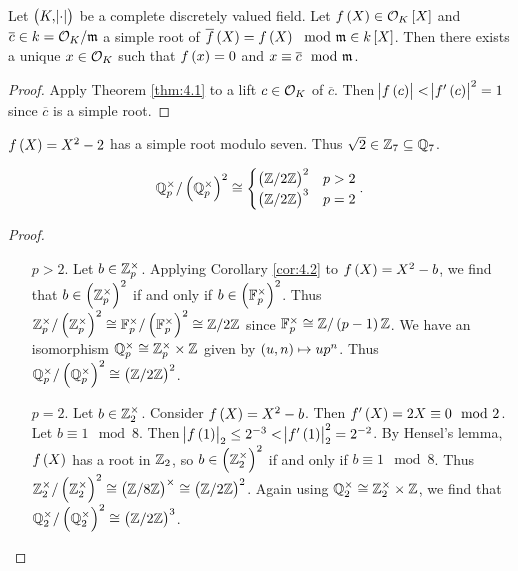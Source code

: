 \begin{corollary}
\label{cor:4.2}
Let $ \br{K, \abs{\cdot}} $ be a complete discretely valued field. Let $ f\br{X} \in \OOO_K\sbr{X} $ and $ \overline{c} \in k = \mathcal{O}_K / \mathfrak{m} $ a simple root of $ \overline{f}\br{X} = f\br{X} \mod \mmm \in k\sbr{X} $. Then there exists a unique $ x \in \mathcal{O}_K $ such that $ f\br{x} = 0 $ and $ x \equiv \overline{c} \mod {\mathfrak{m}} $.
\end{corollary}

\begin{proof}
Apply Theorem \ref{thm:4.1} to a lift $ c \in \mathcal{O}_K $ of $ \overline{c} $. Then $ \abs{f\br{c}} < \abs{f'\br{c}}^2 = 1 $ since $ \overline{c} $ is a simple root.
\end{proof}

\begin{example*}
$ f\br{X} = X^2 - 2 $ has a simple root modulo seven. Thus $ \sqrt{2} \in \mathbb{Z}_7 \subseteq \mathbb{Q}_7 $.
\end{example*}

\pagebreak

\begin{corollary}
$$ \QQ_p^\times / \br{\QQ_p^\times}^2 \cong
\begin{cases}
\br{\ZZ / 2\ZZ}^2 & p > 2 \\
\br{\ZZ / 2\ZZ}^3 & p = 2
\end{cases}.
$$
\end{corollary}

\begin{proof}
\hfill
\begin{itemize}[leftmargin=0.5in]
\item[$ p > 2 $.] Let $ b \in \mathbb{Z}_p^\times $. Applying Corollary \ref{cor:4.2} to $ f\br{X} = X^2 - b $, we find that $ b \in \br{\ZZ_p^\times}^2 $ if and only if $ b \in \br{\FF_p^\times}^2 $. Thus $ \ZZ_p^\times / \br{\ZZ_p^\times}^2 \cong \FF_p^\times / \br{\FF_p^\times}^2 \cong \ZZ / 2\ZZ $ since $ \FF_p^\times \cong \ZZ / \br{p - 1}\ZZ $. We have an isomorphism $ \mathbb{Q}_p^\times \cong \mathbb{Z}_p^\times \times \mathbb{Z} $ given by $ \br{u, n} \mapsto up^n $. Thus $ \QQ_p^\times / \br{\QQ_p^\times}^2 \cong \br{\ZZ / 2\ZZ}^2 $.
\item[$ p = 2 $.] Let $ b \in \mathbb{Z}_2^\times $. Consider $ f\br{X} = X^2 - b $. Then $ f'\br{X} = 2X \equiv 0 \mod 2 $. Let $ b \equiv 1 \mod 8 $. Then $ \abs{f\br{1}}_2 \le 2^{-3} < \abs{f'\br{1}}_2^2 = 2^{-2} $. By Hensel's lemma, $ f\br{X} $ has a root in $ \mathbb{Z}_2 $, so $ b \in \br{\ZZ_2^\times}^2 $ if and only if $ b \equiv 1 \mod 8 $. Thus $ \ZZ_2^\times / \br{\ZZ_2^\times}^2 \cong \br{\ZZ / 8\ZZ}^\times \cong \br{\ZZ / 2\ZZ}^2 $. Again using $ \mathbb{Q}_2^\times \cong \mathbb{Z}_2^\times \times \mathbb{Z} $, we find that $ \QQ_2^\times / \br{\QQ_2^\times}^2 \cong \br{\ZZ / 2\ZZ}^3 $.
\end{itemize}
\end{proof}

